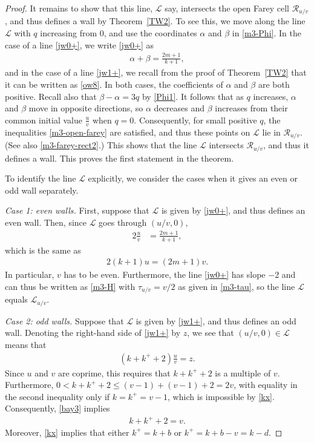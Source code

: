\documentclass[11pt,reqno,tbtags,a4paper]{amsart}
\numberwithin{equation}{section}
\renewcommand\le{\leq}
\renewcommand\leq{\leqslant}
\theoremstyle{plain}%
\theoremstyle{definition}
\theoremstyle{remark}
\newcounter{cases}
\newcommand\pfcase[2]{\smallskip\noindent\emph{Case #1: #2} \noindent}
\newcommand{\refT}[1]{Theorem~\ref{#1}}
\newcommand\ga{\alpha}
\newcommand\gb{\beta}
\newcommand\LL{{\mathcal L}}
\newcommand\HG{\mathcal L} %
\newcommand\cR{{\mathcal R}}
\newcommand\rhs{right-hand side}
\newcommand\uv{_{u/v}}
\newcommand\kx{{k^+}}
\newcommand\0{{\boldsymbol 0}}
\newcommand\1{{\boldsymbol 1}}
\begin{document}
\begin{proof}
It remains to show that this line, $\LL$ say, intersects the open Farey
cell $\cR\uv$, and thus defines a wall by \refT{TW2}.
To see this, we 
move along the line $\LL$ with $q$ increasing from $0$, and use
the coordinates $\ga$ and $\gb$ in \eqref{m3-Phi}. 
In the case of a line \eqref{jw0+}, we write
\eqref{jw0+} as 
\begin{align}\label{em6}
\ga+\gb=\frac{2m+1}{k+1},
\end{align}
and
in the case of a line \eqref{jw1+}, we recall from the proof of \refT{TW2}
that it can be written as \eqref{ow8}.
In both cases, the coefficients of $\ga$ and $\gb$ are both positive.
Recall also that  $\gb-\ga=3q$ by \eqref{Phi1}.
It follows that as $q$ increases, $\ga$ and $\gb$ move in opposite
directions, so $\ga$ decreases and $\gb$ increases from their common initial
value $\frac{u}v$ when $q=0$. 
Consequently, for small positive $q$, the
inequalities \eqref{m3-open-farey} are satisfied, and thus these
points on $\LL$ lie in $\cR\uv$. (See also \eqref{m3-farey-rect2}.)
This shows that the line $\LL$ intersects $\cR\uv$, and thus it defines a
wall. 
This proves the first statement in the theorem.

To identify the line $\LL$ explicitly, we consider the cases when it 
gives an even or odd wall separately.

\pfcase1{even walls.}
 First, suppose that $\LL$ is  given by  \eqref{jw0+},
and thus defines an even wall.
Then, since $\LL$ goes through $(u/v,0)$,
\begin{align}\label{bay1}
    2\frac{u}v&=\frac{2m+1}{k+1},
\end{align}
which is the same as
\begin{align}\label{bay2}
  2(k+1)u=(2m+1)v.
\end{align}
In particular, $v$ has to be even. 
Furthermore, the line \eqref{jw0+} has slope $-2$ and can thus
be written as \eqref{m3-H}
with $\tau\uv=v/2$ as given in \eqref{m3-tau}, 
so the line $\LL$ equals  $\HG\uv$.

\pfcase2{odd walls.}
Suppose that $\LL$ is  given by  \eqref{jw1+},
and thus defines an odd wall.
Denoting the \rhs{} of \eqref{jw1+} by $z$, we see that 
$(u/v,0)\in\LL$ means that
\begin{align}\label{bay3}
  (k+\kx+2)\frac{u}v = z
.\end{align}
%
%
%
%
Since $u$ and $v$ are coprime, this requires that $k+\kx+2$ is a multiple of
$v$.
Furthermore, $0<k+\kx+2\le (v-1)+(v-1)+2=2v$, 
with equality in the second inequality only
if $k=\kx=v-1$, which is impossible by \eqref{kx}. 
Consequently, \eqref{bay3} implies 
\begin{align}\label{bay5}
  k+\kx+2=v.
\end{align}
%
Moreover, \eqref{kx} implies that either $\kx=k+b$ or $\kx=k+b-v=k-d$.


\end{proof}
\end{document}
